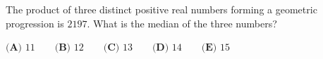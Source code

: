 The product of three distinct positive real numbers forming a geometric progression is $2197$. What is the median of the three numbers?

$\textbf{(A) }11\qquad\textbf{(B) } 12\qquad\textbf{(C) } 13\qquad\textbf{(D) } 14\qquad\textbf{(E) }15$
